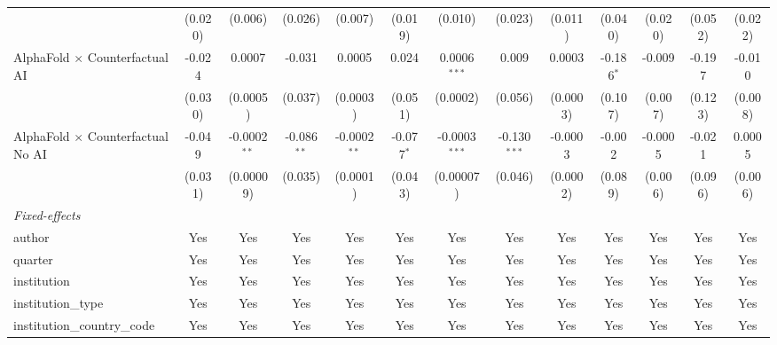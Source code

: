 \begin{tabular}{lcccccccccccc}
                                            & (0.020)       & (0.006)        & (0.026)       & (0.007)        & (0.019)      & (0.010)         & (0.023)        & (0.011)      & (0.040)      & (0.020) & (0.052)      & (0.022)\\   
   AlphaFold $\times$ Counterfactual AI     & -0.024        & 0.0007         & -0.031        & 0.0005         & 0.024        & 0.0006$^{***}$  & 0.009          & 0.0003       & -0.186$^{*}$ & -0.009  & -0.197       & -0.010\\   
                                            & (0.030)       & (0.0005)       & (0.037)       & (0.0003)       & (0.051)      & (0.0002)        & (0.056)        & (0.0003)     & (0.107)      & (0.007) & (0.123)      & (0.008)\\   
   AlphaFold $\times$ Counterfactual No AI  & -0.049        & -0.0002$^{**}$ & -0.086$^{**}$ & -0.0002$^{**}$ & -0.077$^{*}$ & -0.0003$^{***}$ & -0.130$^{***}$ & -0.0003      & -0.002       & -0.0005 & -0.021       & 0.0005\\   
                                            & (0.031)       & (0.00009)      & (0.035)       & (0.0001)       & (0.043)      & (0.00007)       & (0.046)        & (0.0002)     & (0.089)      & (0.006) & (0.096)      & (0.006)\\   
   \midrule
   \emph{Fixed-effects}\\
   author                                   & Yes           & Yes            & Yes           & Yes            & Yes          & Yes             & Yes            & Yes          & Yes          & Yes     & Yes          & Yes\\  
   quarter                                  & Yes           & Yes            & Yes           & Yes            & Yes          & Yes             & Yes            & Yes          & Yes          & Yes     & Yes          & Yes\\  
   institution                              & Yes           & Yes            & Yes           & Yes            & Yes          & Yes             & Yes            & Yes          & Yes          & Yes     & Yes          & Yes\\  
   institution\_type                        & Yes           & Yes            & Yes           & Yes            & Yes          & Yes             & Yes            & Yes          & Yes          & Yes     & Yes          & Yes\\  
   institution\_country\_code               & Yes           & Yes            & Yes           & Yes            & Yes          & Yes             & Yes            & Yes          & Yes          & Yes     & Yes          & Yes\\  

\end{tabular}
